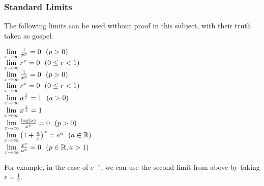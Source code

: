 \documentclass[12pt]{report}
\begin{document}
\begin{flushleft}
\subsubsection*{Standard Limits}
The following limits can be used without proof in this subject, with their 
truth taken as gospel.

\begin{formulalist}
    \(\lim\limits_{x\rightarrow\infty}\frac{1}{x^p} = 0 \:\:\:(p > 0)\) \\
    \(\lim\limits_{x\rightarrow\infty}r^x = 0 \:\:\:(0 \leq r < 1)\) \\
    \(\lim\limits_{x\rightarrow\infty}\frac{1}{x^p} = 0 \:\:\:(p > 0)\) \\
    \(\lim\limits_{x\rightarrow\infty} r^x = 0 \:\:\:(0 \leq r < 1)\) \\
    \(\lim\limits_{x\rightarrow\infty} a^{\frac{1}{x}} = 1 \:\:\:(a > 0)\) \\
    \(\lim\limits_{x\rightarrow\infty} x^{\frac{1}{x}} = 1\) \\
    \(\lim\limits_{x\rightarrow\infty} \frac{\log(x)}{x^p} = 0 \:\:\:(p > 0)\) \\
    \(\lim\limits_{x\rightarrow\infty} \left(1 + \frac{a}{x}\right)^x 
    = e^a \:\:\:(a \in \mathbb{R})\) \\
    \(\lim\limits_{x\rightarrow\infty} \frac{x^p}{a^x} 
    = 0 \:\:\:(p \in \mathbb{R}, a > 1)\) \\  
\end{formulalist}

For example, in the case of \(e^{-x}\), we can use the second limit from above
by taking \(r = \frac{1}{e}\).


\end{flushleft}
\end{document}
